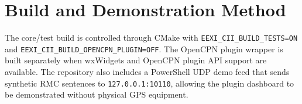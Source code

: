 \section{Build and Demonstration Method}
The core/test build is controlled through CMake with \texttt{EEXI\_CII\_BUILD\_TESTS=ON} and \texttt{EEXI\_CII\_BUILD\_OPENCPN\_PLUGIN=OFF}. The OpenCPN plugin wrapper is built separately when wxWidgets and OpenCPN plugin API support are available. The repository also includes a PowerShell UDP demo feed that sends synthetic RMC sentences to \texttt{127.0.0.1:10110}, allowing the plugin dashboard to be demonstrated without physical GPS equipment.
